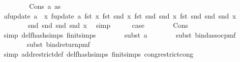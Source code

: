 \begin{isabellebody}
\ \ \isamarkupfalse%
\isanewline
\ \ \ \ \isamarkupfalse%
\ {\isacharparenleft}{\kern0pt}Cons\ a\ as{\isacharparenright}{\kern0pt}\isanewline
\ \ \ \ \isamarkupfalse%
\ a{\isacharcolon}{\kern0pt}{\isachardoublequoteopen}f{}{\isacharunderscore}{\kern0pt}update\ a\ {\isacharequal}{\kern0pt}\ {\isacharparenleft}{\kern0pt}{\isasymlambda}x{\isachardot}{\kern0pt}\ f{}{\isacharunderscore}{\kern0pt}update\ a\ {\isacharparenleft}{\kern0pt}fst\ x{\isacharcomma}{\kern0pt}\ fst\ {\isacharparenleft}{\kern0pt}snd\ x{\isacharparenright}{\kern0pt}{\isacharcomma}{\kern0pt}\ fst\ {\isacharparenleft}{\kern0pt}snd\ {\isacharparenleft}{\kern0pt}snd\ x{\isacharparenright}{\kern0pt}{\isacharparenright}{\kern0pt}{\isacharcomma}{\kern0pt}\ fst\ {\isacharparenleft}{\kern0pt}snd\ {\isacharparenleft}{\kern0pt}snd\ {\isacharparenleft}{\kern0pt}snd\ x{\isacharparenright}{\kern0pt}{\isacharparenright}{\kern0pt}{\isacharparenright}{\kern0pt}{\isacharcomma}{\kern0pt}\ \isanewline
\ \ \ \ \ \ \ \ snd\ {\isacharparenleft}{\kern0pt}snd\ {\isacharparenleft}{\kern0pt}snd\ {\isacharparenleft}{\kern0pt}snd\ x{\isacharparenright}{\kern0pt}{\isacharparenright}{\kern0pt}{\isacharparenright}{\kern0pt}{\isacharparenright}{\kern0pt}{\isacharparenright}{\kern0pt}{\isachardoublequoteclose}\ \isamarkupfalse%
\ simp\isanewline
\ \ \ \ \isamarkupfalse%
\ {\isacharquery}{\kern0pt}case\isanewline
\ \ \ \ \ \ \isamarkupfalse%
\ Cons\ \isamarkupfalse%
\ {\isacharparenleft}{\kern0pt}simp\ del{\isacharcolon}{\kern0pt}f{}{\isacharunderscore}{\kern0pt}hash{\isachardot}{\kern0pt}simps\ f{}{\isacharunderscore}{\kern0pt}init{\isachardot}{\kern0pt}simps{\isacharparenright}{\kern0pt}\isanewline
\ \ \ \ \ \ \isamarkupfalse%
\ {\isacharparenleft}{\kern0pt}subst\ a{\isacharparenright}{\kern0pt}\isanewline
\ \ \ \ \ \ \isamarkupfalse%
\ {\isacharparenleft}{\kern0pt}subst\ bind{\isacharunderscore}{\kern0pt}assoc{\isacharunderscore}{\kern0pt}pmf{\isacharparenright}{\kern0pt}\isanewline
\ \ \ \ \ \ \isamarkupfalse%
\ {\isacharparenleft}{\kern0pt}subst\ bind{\isacharunderscore}{\kern0pt}return{\isacharunderscore}{\kern0pt}pmf{\isacharparenright}{\kern0pt}\isanewline
\ \ \ \ \ \ \isamarkupfalse%
\ {\isacharparenleft}{\kern0pt}simp\ add{\isacharcolon}{\kern0pt}restrict{\isacharunderscore}{\kern0pt}def\ del{\isacharcolon}{\kern0pt}f{}{\isacharunderscore}{\kern0pt}hash{\isachardot}{\kern0pt}simps\ f{}{\isacharunderscore}{\kern0pt}init{\isachardot}{\kern0pt}simps\ cong{\isacharcolon}{\kern0pt}restrict{\isacharunderscore}{\kern0pt}cong{\isacharparenright}{\kern0pt}\isanewline

\end{isabellebody}
